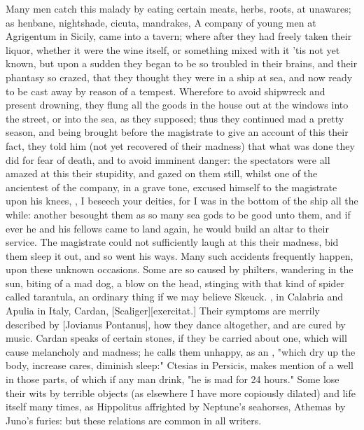 Many men catch this malady by eating certain meats, herbs, roots, at unawares;
as henbane, nightshade, cicuta, mandrakes, \etc{} A
company of young men at Agrigentum in Sicily, came into a tavern; where after
they had freely taken their liquor, whether it were the wine itself, or
something mixed with it 'tis not yet known, but upon a
sudden they began to be so troubled in their brains, and their phantasy so
crazed, that they thought they were in a ship at sea, and now ready to be cast
away by reason of a tempest. Wherefore to avoid shipwreck and present drowning,
they flung all the goods in the house out at the windows into the street, or
into the sea, as they supposed; thus they continued mad a pretty season, and
being brought before the magistrate to give an account of this their fact, they
told him (not yet recovered of their madness) that what was done they did for
fear of death, and to avoid imminent danger: the spectators were all amazed at
this their stupidity, and gazed on them still, whilst one of the ancientest of
the company, in a grave tone, excused himself to the magistrate upon his knees,
, I beseech your deities, \etc{} for I
was in the bottom of the ship all the while: another besought them as so many
sea gods to be good unto them, and if ever he and his fellows came to land
again, he would build an altar to their service. The
magistrate could not sufficiently laugh at this their madness, bid them sleep
it out, and so went his ways. Many such accidents frequently happen, upon these
unknown occasions. Some are so caused by philters, wandering in the sun, biting
of a mad dog, a blow on the head, stinging with that kind of spider called
tarantula, an ordinary thing if we may believe Skeuck. , in Calabria and Apulia in Italy, Cardan,
 [Scaliger][\textlatin{exercitat.}]  Their symptoms are merrily described by [Jovianus Pontanus],
 how they dance altogether, and are cured by
music. Cardan speaks of certain stones, if they be carried
about one, which will cause melancholy and madness; he calls them unhappy, as
an , \etc{} "which dry up the body,
increase cares, diminish sleep:" Ctesias in Persicis, makes mention of a well
in those parts, of which if any man drink, "he is mad for
24 hours." Some lose their wits by terrible objects (as elsewhere I have more
copiously dilated) and life itself many times, as
Hippolitus affrighted by Neptune's seahorses, Athemas by Juno's furies: but
these relations are common in all writers.

